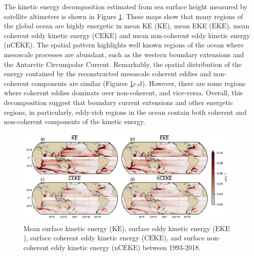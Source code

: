 \documentclass[draft,linenumbers]{agujournal2019}
\newcommand{\MKE}{\overline{\textrm{KE}}}
\newcommand{\MEKE}{\overline{\textrm{EKE}}}
\newcommand{\MCEKE}{\overline{\textrm{CEKE}}}
\newcommand{\MnCEKE}{\overline{\textrm{nCEKE}}}
\begin{document}
	The kinetic energy decomposition estimated from sea surface height measured by satellite altimeters is shown in Figure \ref{fig:eddy_climatology}. 
	These maps show that many regions of the global ocean are highly energetic in mean KE ($\MKE$), mean EKE ($\MEKE$), mean coherent eddy kinetic energy ($\MCEKE$) and mean non-coherent eddy kinetic energy ($\MnCEKE$). 
	The spatial pattern highlights well known regions of the ocean where mesoscale processes are abundant, such as the western boundary extensions and the Antarctic Circumpolar Current. 
	Remarkably, the spatial distribution of the energy contained by the reconstructed mesoscale coherent eddies and non-coherent components are similar (Figures \ref{fig:eddy_climatology}c,d). 
	However, there are some regions where coherent eddies dominate over non-coherent, and vice-versa. 
	Overall, this decomposition suggest that boundary current extensions and other energetic regions, in particularly, eddy-rich regions in the ocean contain both coherent and non-coherent components of the kinetic energy.

	\begin{figure}[t]
	    \centering
	    \includegraphics[width=1\textwidth]{figures/mean_ke_maps_satellite.pdf}
	    \caption{Mean surface kinetic energy ($\MKE$), surface eddy kinetic energy ($\MEKE$), surface coherent eddy kinetic energy ($\MCEKE$), and surface non-coherent eddy kinetic energy ($\MnCEKE$) between 1993-2018.}
	    \label{fig:eddy_climatology}
	\end{figure}
\end{document}
